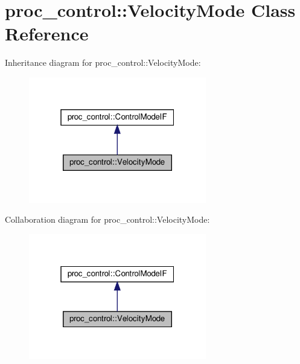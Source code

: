 \hypertarget{classproc__control_1_1_velocity_mode}{}\section{proc\+\_\+control\+:\+:Velocity\+Mode Class Reference}
\label{classproc__control_1_1_velocity_mode}


Inheritance diagram for proc\+\_\+control\+:\+:Velocity\+Mode\+:\nopagebreak
\begin{figure}[H]
\begin{center}
\leavevmode
\includegraphics[width=220pt]{classproc__control_1_1_velocity_mode__inherit__graph}
\end{center}
\end{figure}


Collaboration diagram for proc\+\_\+control\+:\+:Velocity\+Mode\+:\nopagebreak
\begin{figure}[H]
\begin{center}
\leavevmode
\includegraphics[width=220pt]{classproc__control_1_1_velocity_mode__coll__graph}
\end{center}
\end{figure}
